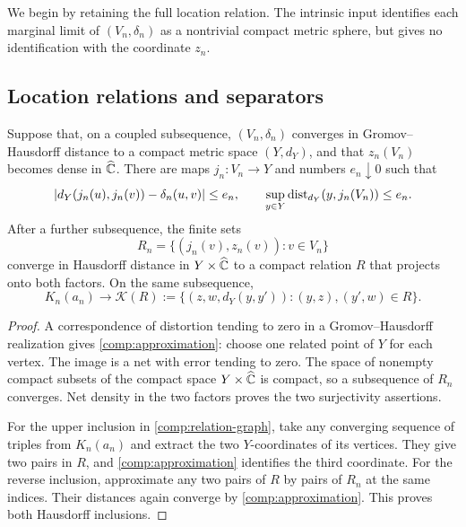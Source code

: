 We begin by retaining the full location relation.  The intrinsic
input identifies each marginal limit of $(V_n,\delta_n)$ as a
nontrivial compact metric sphere, but gives no identification with
the coordinate $z_n$.

\subsection{Location relations and separators}

\begin{lemma}
\label{comp:relation}
Suppose that, on a coupled subsequence,
$(V_n,\delta_n)$ converges in Gromov--Hausdorff distance to a compact
metric space $(Y,d_Y)$, and that $z_n(V_n)$ becomes dense in $\widehat{\mathbb C}$.
There are maps $j_n:V_n\to Y$ and numbers $e_n\downarrow0$ such that
\begin{equation}
 \label{comp:approximation}
 \left|d_Y(j_n(u),j_n(v))-\delta_n(u,v)\right|\le e_n,
 \qquad
 \sup_{y\in Y}\dist_{d_Y}(y,j_n(V_n))\le e_n.
\end{equation}
After a further subsequence, the finite sets
\[
 R_n=\{(j_n(v),z_n(v)):v\in V_n\}
\]
converge in Hausdorff distance in $Y\times\widehat{\mathbb C}$ to a compact relation
$R$ that projects onto both factors.  On the same subsequence,
\begin{equation}
 \label{comp:relation-graph}
 K_n(a_n)\longrightarrow
 \mathcal K(R):=
 \{(z,w,d_Y(y,y')):(y,z),(y',w)\in R\}.
\end{equation}
\end{lemma}

\begin{proof}
A correspondence of distortion tending to zero in a
Gromov--Hausdorff realization gives \eqref{comp:approximation}: choose
one related point of $Y$ for each vertex.  The image is a net with
error tending to zero.  The space of nonempty compact subsets of the
compact space $Y\times\widehat{\mathbb C}$ is compact, so a subsequence of $R_n$
converges.  Net density in the two factors proves the two surjectivity
assertions.

For the upper inclusion in \eqref{comp:relation-graph}, take any
converging sequence of triples from $K_n(a_n)$ and extract the two
$Y$-coordinates of its vertices.  They give two pairs in $R$, and
\eqref{comp:approximation} identifies the third coordinate.  For the
reverse inclusion, approximate any two pairs of $R$ by pairs of $R_n$
at the same indices.  Their distances again converge by
\eqref{comp:approximation}.  This proves both Hausdorff inclusions.
\end{proof}

